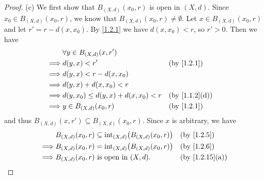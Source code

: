\begin{proof}{(c)}
  We first show that \(B_{(X, d)}(x_0, r)\) is open in \((X, d)\).
  Since \(x_0 \in B_{(X, d)}(x_0, r)\), we know that \(B_{(X, d)}(x_0, r) \neq \emptyset\).
  Let \(x \in B_{(X, d)}(x_0, r)\) and let \(r' = r - d(x, x_0)\).
  By \cref{1.2.1} we have \(d(x, x_0) < r\), so \(r' > 0\).
  Then we have
  \begin{align*}
             & \forall y \in B_{(X, d)}(x, r')                                         \\
    \implies & d(y, x) < r'                           &  & \by{1.2.1}                  \\
    \implies & d(y, x) < r - d(x, x_0)                                                 \\
    \implies & d(y, x) + d(x, x_0) < r                                                 \\
    \implies & d(y, x_0) \leq d(y, x) + d(x, x_0) < r &  & \text{(by \cref{1.1.2}(d))} \\
    \implies & y \in B_{(X, d)}(x_0, r)               &  & \by{1.2.1}
  \end{align*}
  and thus \(B_{(X, d)}(x, r') \subseteq B_{(X, d)}(x_0, r)\).
  Since \(x\) is arbitrary, we have
  \begin{align*}
             & B_{(X, d)}(x_0, r) \subseteq \text{int}_{(X, d)}\big(B_{(X, d)}(x_0, r)\big) &  & \by{1.2.5}                   \\
    \implies & B_{(X, d)}(x_0, r) = \text{int}_{(X, d)}\big(B_{(X, d)}(x_0, r)\big)         &  & \by{1.2.6}                   \\
    \implies & B_{(X, d)}(x_0, r) \text{ is open in } (X, d).                               &  & \text{(by \cref{1.2.15}(a))}
  \end{align*}


\end{proof}
